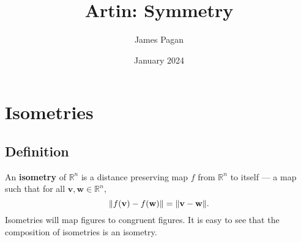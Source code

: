 \documentclass[11pt]{article}
\title{Artin: Symmetry}
\author{James Pagan}
\date{January 2024}
\renewcommand{\vec}[1]{\mathbf{#1}}
\begin{document}
\maketitle
\tableofcontents
\newpage 


\section{Isometries}


\subsection{Definition}

An \textbf{isometry} of $\mathbb{R}^{n}$ is a distance preserving map $f$ from $\mathbb{R}^{n}$ to itself --- a map such that for all $\vec{v}, \vec{w} \in \mathbb{R}^{n}$,
\[
	\norm{f(\vec{v}) - f(\vec{w})} = \norm{\vec{v} - \vec{w}}.
\]
Isometries will map figures to congruent figures. It is easy to see that the composition of isometries is an isometry.

\end{document}

